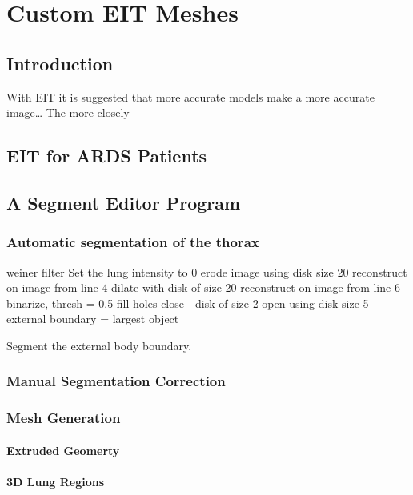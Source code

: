 \chapter{Custom EIT Meshes}
\label{chap:chapter-5}

\section{Introduction}

With EIT it is suggested that more accurate models make a more accurate image\dots
The more closely 

\section{EIT for ARDS Patients}

\section{A Segment Editor Program}

\subsection{Automatic segmentation of the thorax}
\begin{algorithm}[H]
	\SetAlgoLined
		weiner filter\;
		Set the lung intensity to 0\;
		erode image using disk size 20\;
		reconstruct on image from line 4\;
		dilate with disk of size 20\;
		reconstruct on image from line 6\;
		binarize, thresh = 0.5\;
		fill holes\;
		close - disk of size 2\;
		open using disk size 5\;
		external boundary = largest object\;
	\caption{Segment the external body boundary.}
\end{algorithm}

\subsection{Manual Segmentation Correction}

\subsection{Mesh Generation}
\subsubsection{Extruded Geomerty}
\subsubsection{3D Lung Regions}


